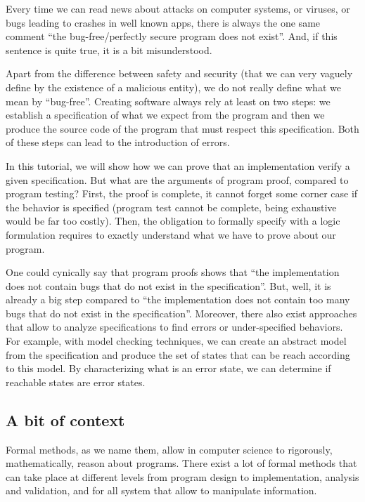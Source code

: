\documentclass[12pt,francais,]{scrbook}
\begin{document}
Every time we can read news about attacks on computer systems, or
viruses, or bugs leading to crashes in well known apps, there is always
the one same comment ``the bug-free/perfectly secure program does not
exist''. And, if this sentence is quite true, it is a bit misunderstood.

Apart from the difference between safety and security (that we can very
vaguely define by the existence of a malicious entity), we do not really
define what we mean by ``bug-free''. Creating software always rely at
least on two steps: we establish a specification of what we expect from
the program and then we produce the source code of the program that must
respect this specification. Both of these steps can lead to the
introduction of errors.

In this tutorial, we will show how we can prove that an implementation
verify a given specification. But what are the arguments of program
proof, compared to program testing? First, the proof is complete, it
cannot forget some corner case if the behavior is specified (program
test cannot be complete, being exhaustive would be far too costly).
Then, the obligation to formally specify with a logic formulation
requires to exactly understand what we have to prove about our program.

One could cynically say that program proofs shows that ``the
implementation does not contain bugs that do not exist in the
specification''. But, well, it is already a big step compared to ``the
implementation does not contain too many bugs that do not exist in the
specification''. Moreover, there also exist approaches that allow to
analyze specifications to find errors or under-specified behaviors. For
example, with model checking techniques, we can create an abstract model
from the specification and produce the set of states that can be reach
according to this model. By characterizing what is an error state, we
can determine if reachable states are error states.

\subsection{A bit of context}\label{a-bit-of-context}

Formal methods, as we name them, allow in computer science to
rigorously, mathematically, reason about programs. There exist a lot of
formal methods that can take place at different levels from program
design to implementation, analysis and validation, and for all system
that allow to manipulate information.
\end{document}
